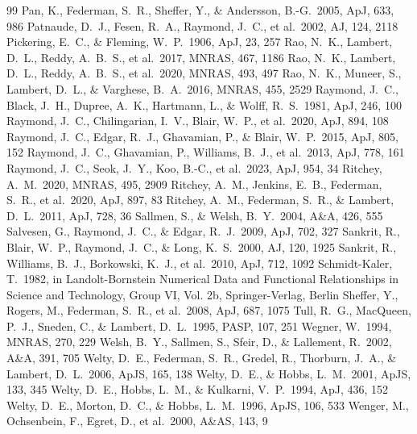 \documentclass[fleqn,usenatbib]{mnras}
\begin{document}
\begin{thebibliography}{99}
 Pan, K., Federman, S.~R., Sheffer, Y., \& Andersson, B.-G.\ 2005, ApJ, 633, 986
 Patnaude, D.~J., Fesen, R.~A., Raymond, J.~C., et al.\ 2002, AJ, 124, 2118
 Pickering, E.~C., \& Fleming, W.~P.\ 1906, ApJ, 23, 257
 Rao, N.~K., Lambert, D.~L., Reddy, A.~B.~S., et al.\ 2017, MNRAS, 467, 1186
 Rao, N.~K., Lambert, D.~L., Reddy, A.~B.~S., et al.\ 2020, MNRAS, 493, 497
 Rao, N.~K., Muneer, S., Lambert, D.~L., \& Varghese, B.~A.\ 2016, MNRAS, 455, 2529
 Raymond, J.~C., Black, J.~H., Dupree, A.~K., Hartmann, L., \& Wolff, R.~S.\ 1981, ApJ, 246, 100
 Raymond, J.~C., Chilingarian, I.~V., Blair, W.~P., et al.\ 2020, ApJ, 894, 108
 Raymond, J.~C., Edgar, R.~J., Ghavamian, P., \& Blair, W.~P.\ 2015, ApJ, 805, 152
 Raymond, J.~C., Ghavamian, P., Williams, B.~J., et al.\ 2013, ApJ, 778, 161
 Raymond, J.~C., Seok, J.~Y., Koo, B.-C., et al.\ 2023, ApJ, 954, 34
 Ritchey, A.~M.\ 2020, MNRAS, 495, 2909
 Ritchey, A.~M., Jenkins, E.~B., Federman, S.~R., et al.\ 2020, ApJ, 897, 83
 Ritchey, A.~M., Federman, S.~R., \& Lambert, D.~L.\ 2011, ApJ, 728, 36
 Sallmen, S., \& Welsh, B.~Y.\ 2004, A\&A, 426, 555
 Salvesen, G., Raymond, J.~C., \& Edgar, R.~J.\ 2009, ApJ, 702, 327
 Sankrit, R., Blair, W.~P., Raymond, J.~C., \& Long, K.~S.\ 2000, AJ, 120, 1925
 Sankrit, R., Williams, B.~J., Borkowski, K.~J., et al.\ 2010, ApJ, 712, 1092
 Schmidt-Kaler, T.\ 1982, in Landolt-Bornstein Numerical Data and Functional Relationships in Science and Technology, Group VI, Vol. 2b, Springer-Verlag, Berlin
 Sheffer, Y., Rogers, M., Federman, S.~R., et al.\ 2008, ApJ, 687, 1075
 Tull, R.~G., MacQueen, P.~J., Sneden, C., \& Lambert, D.~L.\ 1995, PASP, 107, 251
 Wegner, W.\ 1994, MNRAS, 270, 229
 Welsh, B.~Y., Sallmen, S., Sfeir, D., \& Lallement, R.\ 2002, A\&A, 391, 705
 Welty, D.~E., Federman, S.~R., Gredel, R., Thorburn, J.~A., \& Lambert, D.~L.\ 2006, ApJS, 165, 138
 Welty, D.~E., \& Hobbs, L.~M.\ 2001, ApJS, 133, 345
 Welty, D.~E., Hobbs, L.~M., \& Kulkarni, V.~P.\ 1994, ApJ, 436, 152
 Welty, D.~E., Morton, D.~C., \& Hobbs, L.~M.\ 1996, ApJS, 106, 533
 Wenger, M., Ochsenbein, F., Egret, D., et al.\ 2000, A\&AS, 143, 9
\end{thebibliography}
\end{document}
